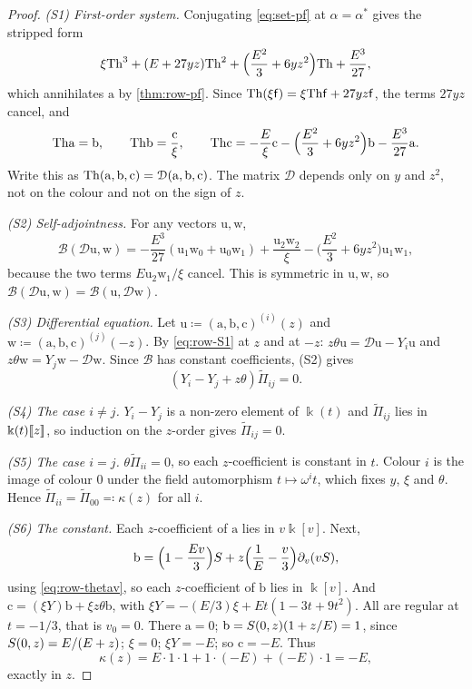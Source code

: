 \begin{proof}
\emph{(S1) First-order system.} Conjugating \eqref{eq:set-pf} at $\alpha=\alpha^*$ gives the stripped form
\[
\xi\mathrm{Th}^3+(E+27yz)\mathrm{Th}^2+\Big(\frac{E^2}{3}+6yz^2\Big)\mathrm{Th}+\frac{E^3}{27},
\]
which annihilates $\mathrm{a}$ by \cref{thm:row-pf}. Since $\mathrm{Th}(\xi\mathsf{f})=\xi\mathrm{Th}\mathsf{f}+27yz\mathsf{f}$, the terms $27yz$ cancel, and
\begin{equation}
\label{eq:row-S1}
\mathrm{Th}\mathrm{a}=\mathrm{b},\qquad\mathrm{Th}\mathrm{b}=\frac{\mathrm{c}}{\xi},\qquad\mathrm{Th}\mathrm{c}=-\frac E\xi\mathrm{c}-\Big(\frac{E^2}{3}+6yz^2\Big)\mathrm{b}-\frac{E^3}{27}\mathrm{a}.
\end{equation}
Write this as $\mathrm{Th}(\mathrm{a},\mathrm{b},\mathrm{c})=\mathcal{D}(\mathrm{a},\mathrm{b},\mathrm{c})$. The matrix $\mathcal{D}$ depends only on $y$ and $z^2$, not on the colour and not on the sign of $z$.

\emph{(S2) Self-adjointness.} For any vectors $\mathrm{u},\mathrm{w}$,
\[
\mathscr{B}(\mathcal{D}\mathrm{u},\mathrm{w})=-\frac{E^3}{27}(\mathrm{u}_1\mathrm{w}_0+\mathrm{u}_0\mathrm{w}_1)+\frac{\mathrm{u}_2\mathrm{w}_2}{\xi}-\Big(\frac{E^2}{3}+6yz^2\Big)\mathrm{u}_1\mathrm{w}_1,
\]
because the two terms $E\mathrm{u}_2\mathrm{w}_1/\xi$ cancel. This is symmetric in $\mathrm{u},\mathrm{w}$, so $\mathscr{B}(\mathcal{D}\mathrm{u},\mathrm{w})=\mathscr{B}(\mathrm{u},\mathcal{D}\mathrm{w})$.

\emph{(S3) Differential equation.} Let $\mathrm{u}\coloneqq(\mathrm{a},\mathrm{b},\mathrm{c})^{(i)}(z)$ and $\mathrm{w}\coloneqq(\mathrm{a},\mathrm{b},\mathrm{c})^{(j)}(-z)$. By \eqref{eq:row-S1} at $z$ and at $-z$: $z\theta\mathrm{u}=\mathcal{D}\mathrm{u}-Y_i\mathrm{u}$ and $z\theta\mathrm{w}=Y_j\mathrm{w}-\mathcal{D}\mathrm{w}$. Since $\mathscr{B}$ has constant coefficients, (S2) gives
\[
(Y_i-Y_j+z\theta)\widetilde\Pi_{ij}=0.
\]

\emph{(S4) The case $i\neq j$.} $Y_i-Y_j$ is a non-zero element of $\Bbbk(t)$ and $\widetilde\Pi_{ij}$ lies in $\Bbbk(t)[\![ z ]\!]$, so induction on the $z$-order gives $\widetilde\Pi_{ij}=0$.

\emph{(S5) The case $i=j$.} $\theta\widetilde\Pi_{ii}=0$, so each $z$-coefficient is constant in $t$. Colour $i$ is the image of colour $0$ under the field automorphism $t\mapsto\omega^it$, which fixes $y$, $\xi$ and $\theta$. Hence $\widetilde\Pi_{ii}=\widetilde\Pi_{00}\eqqcolon\kappa(z)$ for all $i$.

\emph{(S6) The constant.} Each $z$-coefficient of $\mathrm{a}$ lies in $v\Bbbk[v]$. Next,
\[
\mathrm{b}=\Big(1-\frac{Ev}3\Big)S+z\Big(\frac1E-\frac v3\Big)\partial_v(vS),
\]
using \eqref{eq:row-thetav}, so each $z$-coefficient of $\mathrm{b}$ lies in $\Bbbk[v]$. And $\mathrm{c}=(\xi Y)\mathrm{b}+\xi z\theta\mathrm{b}$, with $\xi Y=-(E/3)\xi+Et(1-3t+9t^2)$. All are regular at $t=-1/3$, that is $v_0=0$. There $\mathrm{a}=0$; $\mathrm{b}=S(0,z)(1+z/E)=1$, since $S(0,z)=E/(E+z)$; $\xi=0$; $\xi Y=-E$; so $\mathrm{c}=-E$. Thus
\[
\kappa(z)=E\cdot1\cdot1+1\cdot(-E)+(-E)\cdot1=-E,
\]
exactly in $z$.
\end{proof}

